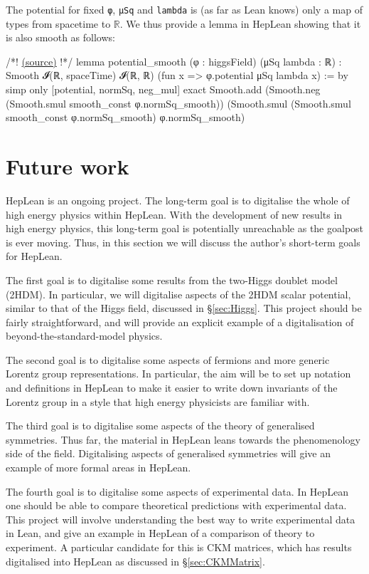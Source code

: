 \documentclass[a4paper, 11pt]{article}
\newcommand{\codeLink}[1]{
  \vspace{-0.5cm}\hfill\href{https://github.com/HEPLean/HepLean/blob/1b951994ae3d882242b02d23957ef1ee7fa05f3d/HepLean/#1}{(source)}
  }
\begin{document}
 The potential for fixed \lstinline|φ|, \lstinline|μSq| and \lstinline|lambda| is (as far as Lean knows) only a map of types from spacetime to $\mathbb{R}$.  We thus provide a lemma in HepLean showing that it is also smooth as follows:
\begin{code}
/*!\codeLink{StandardModel/HiggsField.lean\#L448}!*/
lemma potential_smooth (φ : higgsField) (μSq lambda : ℝ) :
    Smooth 𝓘(ℝ, spaceTime) 𝓘(ℝ, ℝ) (fun x => φ.potential μSq lambda x) := by	
  simp only [potential, normSq, neg_mul]
  exact Smooth.add
    (Smooth.neg (Smooth.smul smooth_const φ.normSq_smooth))
    (Smooth.smul (Smooth.smul smooth_const φ.normSq_smooth) φ.normSq_smooth)
\end{code}


\section{Future work}\label{sec:future}
HepLean is an ongoing project. The long-term goal is to digitalise the whole of high energy physics within HepLean. With the development of new results in high energy physics, this long-term goal is potentially unreachable as the goalpost is ever moving.  Thus, in this section we will discuss the author's short-term goals for HepLean. 

The first goal is to digitalise some results from the two-Higgs doublet model (2HDM). In particular, we will digitalise aspects of the 2HDM scalar potential, similar to that of the Higgs field, discussed in \S\ref{sec:Higgs}. This project should be fairly straightforward, and will provide an explicit example of a digitalisation of beyond-the-standard-model physics. 

The second goal is to digitalise some aspects of fermions and more generic Lorentz group representations. In particular, the aim will be to set up notation and definitions in HepLean to make it easier to write down invariants of the Lorentz group in a style that high energy physicists are familiar with.  

The third goal is to digitalise some aspects of the theory of generalised symmetries. Thus far, the
material in HepLean leans towards the phenomenology side of the field. Digitalising aspects of
generalised symmetries will give an example of more formal areas in HepLean.

The fourth goal is to digitalise some aspects of experimental data. In HepLean one should be able to compare theoretical predictions with experimental data. This project will involve understanding the best way to write experimental data in Lean, and give an example in HepLean of a comparison of theory to experiment. A particular candidate for this is CKM matrices, which  has  results digitalised into HepLean as discussed in \S\ref{sec:CKMMatrix}. 
\end{document}
